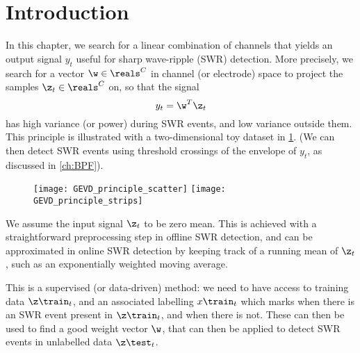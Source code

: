 \section{Introduction}
\label{sec:GEVD_overview}

In this chapter, we search for a linear combination of channels that yields
an output signal $y_t$ useful for sharp wave-ripple (SWR) detection. More
precisely, we search for a vector $\w \in \reals^C$ in channel (or electrode)
space to project the samples $\z_t \in \reals^C$ on, so that the signal
%
\begin{equation}
\label{eq:linear}
y_t = \w^T \z_t
\end{equation}
%
has high variance (or power) during SWR events, and low variance outside
them. This principle is illustrated with a two-dimensional toy dataset in
\cref{fig:GEVD_principle}. (We can then detect SWR events using threshold
crossings of the envelope of $y_t$, as discussed in \cref{ch:BPF}).


\begin{figure}
\texttt{[image: GEVD\_principle\_scatter]}
\texttt{[image: GEVD\_principle\_strips]}
\label{fig:GEVD_principle}
\end{figure}


We assume the input signal $\z_t$ to be zero mean. This is achieved with a
straightforward preprocessing step in offline SWR detection, and can be
approximated in online SWR detection by keeping track of a running mean of
$\z_t$, such as an exponentially weighted moving average.

This is a supervised (or data-driven) method: we need to have access to
training data $\z\train_t$, and an associated labelling $x\train_t$ which
marks when there is an SWR event present in $\z\train_t$, and when there is
not. These can then be used to find a good weight vector $\w$, that can then
be applied to detect SWR events in unlabelled data $\z\test_t$.

